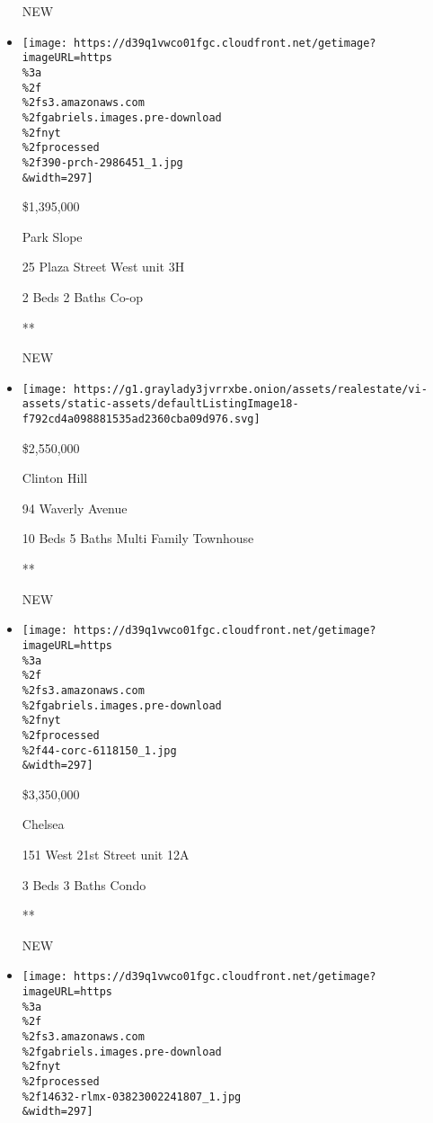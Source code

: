 \begin{itemize}
  NEW
\item
  \href{/real-estate/usa/ny/brooklyn/park-slope/homes-for-sale/25-plaza-street-west/390-PRCH-2986451?}{}

  \texttt{[image: https://d39q1vwco01fgc.cloudfront.net/getimage?imageURL=https\\\%3a\\\%2f\\\%2fs3.amazonaws.com\\\%2fgabriels.images.pre-download\\\%2fnyt\\\%2fprocessed\\\%2f390-prch-2986451\_1.jpg\\\&width=297]}

  \$1,395,000

  Park Slope

  25 Plaza Street West unit 3H

  2 Beds \textbar{} 2 Baths \textbar{} Co-op

  **

  NEW
\item
  \href{/real-estate/usa/ny/brooklyn/clinton-hill/homes-for-sale/94-waverly-avenue/12436-OLRS-0079241?}{}

  \texttt{[image: https://g1.graylady3jvrrxbe.onion/assets/realestate/vi-assets/static-assets/defaultListingImage18-f792cd4a098881535ad2360cba09d976.svg]}

  \$2,550,000

  Clinton Hill

  94 Waverly Avenue

  10 Beds \textbar{} 5 Baths \textbar{} Multi Family Townhouse

  **

  NEW
\item
  \href{/real-estate/usa/ny/new-york/chelsea/homes-for-sale/151-west-21st-street/44-CORC-6118150?}{}

  \texttt{[image: https://d39q1vwco01fgc.cloudfront.net/getimage?imageURL=https\\\%3a\\\%2f\\\%2fs3.amazonaws.com\\\%2fgabriels.images.pre-download\\\%2fnyt\\\%2fprocessed\\\%2f44-corc-6118150\_1.jpg\\\&width=297]}

  \$3,350,000

  Chelsea

  151 West 21st Street unit 12A

  3 Beds \textbar{} 3 Baths \textbar{} Condo

  **

  NEW
\item
  \href{/real-estate/usa/ny/new-york/kips-bay/homes-for-sale/145-east-29th-street/14632-RLMX-03823002241807?}{}

  \texttt{[image: https://d39q1vwco01fgc.cloudfront.net/getimage?imageURL=https\\\%3a\\\%2f\\\%2fs3.amazonaws.com\\\%2fgabriels.images.pre-download\\\%2fnyt\\\%2fprocessed\\\%2f14632-rlmx-03823002241807\_1.jpg\\\&width=297]}


\end{itemize}
